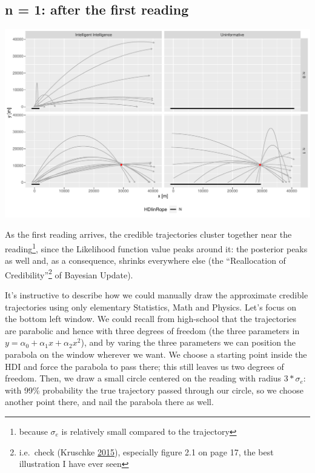 \documentclass[]{article}
\begin{document}
\hypertarget{n-1-after-the-first-reading}{%
\subsection{n = 1: after the first
reading}\label{n-1-after-the-first-reading}}

\begin{center}\includegraphics[width=1.0\textwidth]{bayesian_artillery_files/figure-latex/plot_1-1} \end{center}

As the first reading arrives, the credible trajectories cluster together
near the reading\footnote{because \(\sigma_e\) is relatively small
  compared to the trajectory}, since the Likelihood function value peaks
around it: the posterior peaks as well and, as a consequence, shrinks
everywhere else (the ``Reallocation of Credibility''\footnote{i.e.~check
  (Kruschke \protect\hyperlink{ref-DBDA2E}{2015}), especially figure 2.1
  on page 17, the best illustration I have ever seen} of Bayesian
Update).

It's instructive to describe how we could manually draw the approximate
credible trajectories using only elementary Statistics, Math and
Physics. Let's focus on the bottom left window. We could recall from
high-school that the trajectories are parabolic and hence with three
degrees of freedom (the three parameters in
\(y=\alpha_0 + \alpha_1x+\alpha_2x^2\)), and by varing the three
parameters we can position the parabola on the window wherever we want.
We choose a starting point inside the HDI and force the parabola to pass
there; this still leaves us two degrees of freedom. Then, we draw a
small circle centered on the reading with radius \(3*\sigma_e\): with
99\% probability the true trajectory passed through our circle, so we
choose another point there, and nail the parabola there as well.
\end{document}
